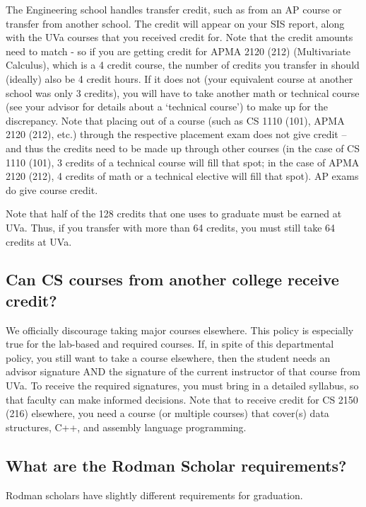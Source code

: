 \documentclass[10pt,letter]{book}
\begin{document}
The Engineering school handles transfer credit, such as from an AP
course or transfer from another school. The credit will appear on your
SIS report, along with the UVa courses that you received credit
for. Note that the credit amounts need to match - so if you are
getting credit for APMA 2120 (212) (Multivariate Calculus), which is a
4 credit course, the number of credits you transfer in should
(ideally) also be 4 credit hours. If it does not (your equivalent
course at another school was only 3 credits), you will have to take
another math or technical course (see your advisor for details about a
‘technical course’) to make up for the discrepancy. Note that placing
out of a course (such as CS 1110 (101), APMA 2120 (212), etc.) through
the respective placement exam does not give credit – and thus the
credits need to be made up through other courses (in the case of CS
1110 (101), 3 credits of a technical course will fill that spot; in
the case of APMA 2120 (212), 4 credits of math or a technical elective
will fill that spot). AP exams do give course credit.

Note that half of the 128 credits that one uses to graduate must be
earned at UVa. Thus, if you transfer with more than 64 credits, you
must still take 64 credits at UVa.

\subsection{Can CS courses from another college receive credit?}

We officially discourage taking major courses elsewhere. This policy
is especially true for the lab-based and required courses. If, in
spite of this departmental policy, you still want to take a course
elsewhere, then the student needs an advisor signature AND the
signature of the current instructor of that course from UVa. To
receive the required signatures, you must bring in a detailed
syllabus, so that faculty can make informed decisions. Note that to
receive credit for CS 2150 (216) elsewhere, you need a course (or
multiple courses) that cover(s) data structures, C++, and assembly
language programming.

\subsection{What are the Rodman Scholar requirements?}

Rodman scholars have slightly different requirements for graduation.
\end{document}
